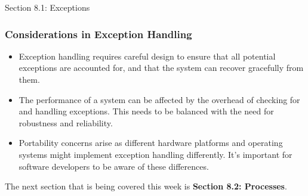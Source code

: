 \begin{notes}{Section 8.1: Exceptions}
    \subsubsection*{Considerations in Exception Handling}
    
    \begin{itemize}
        \item Exception handling requires careful design to ensure that all potential exceptions are accounted for, and that the system can recover gracefully from them.
        \item The performance of a system can be affected by the overhead of checking for and handling exceptions. This needs to be balanced with the need for robustness and reliability.
        \item Portability concerns arise as different hardware platforms and operating systems might implement exception handling differently. It's important for software developers to be aware of 
        these differences.
    \end{itemize}    
\end{notes}

The next section that is being covered this week is \textbf{Section 8.2: Processes}.

